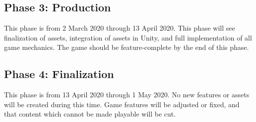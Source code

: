 \documentclass[titlepage]{article}
\begin{document}
\subsection*{Phase 3: Production}

This phase is from 2 March 2020 through 13 April 2020. This phase will see
finalization of assets, integration of assets in Unity, and full implementation
of all game mechanics. The game should be feature-complete by the end of this
phase.

\subsection*{Phase 4: Finalization}

This phase is from 13 April 2020 through 1 May 2020. No new features or assets
will be created during this time. Game features will be adjusted or fixed, and
that content which cannot be made playable will be cut.

\end{document}
